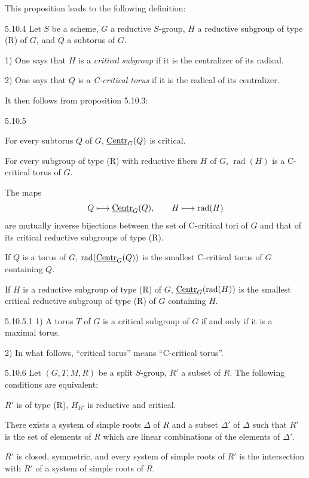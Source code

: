 This proposition leads to the following definition:
\begin{definition}{5.10.4}\label{XXII.5.10.4}
Let $S$ be a scheme, $G$ a reductive $S$-group, $H$ a reductive subgroup of type (R) of $G$, and $Q$ a subtorus of $G$.{\renewcommand{\thefootnote}{(58)}}

1) One says that $H$ is a \emph{critical subgroup} if it is the centralizer of its radical.

2) One says that $Q$ is a \emph{C-critical torus} if it is the radical of its centralizer.
\end{definition}
It then follows from proposition 5.10.3:
\begin{corollary}{5.10.5}\label{XXII.5.10.5}
\begin{enumeratei}
\item For every subtorus $Q$ of $G$, $\underline{\mathrm{Centr}}_G(Q)$ is critical.
\item For every subgroup of type (R) with reductive fibers $H$ of $G$, $\operatorname{rad}(H)$ is a C-critical torus of $G$.
\item The maps
\[
Q\longmapsto\underline{\mathrm{Centr}}_G(Q),\qquad H\longmapsto\operatorname{rad}(H)
\]
are mutually inverse bijections between the set of C-critical tori of $G$ and that of its critical reductive subgroups of type (R).
\item If $Q$ is a torus of $G$, $\operatorname{rad}(\underline{\mathrm{Centr}}_G(Q))$ is the smallest C-critical torus of $G$ containing $Q$.
\item If $H$ is a reductive subgroup of type (R) of $G$, $\underline{\mathrm{Centr}}_G(\operatorname{rad}(H))$ is the smallest critical reductive subgroup of type (R) of $G$ containing $H$.
\end{enumeratei}
\end{corollary}
\begin{remark}{5.10.5.1}\label{XXII.5.10.5.1}
{\renewcommand{\thefootnote}{(58)}\footnotemark[59]}%
1) A torus $T$ of $G$ is a critical subgroup of $G$ if and only if it is a maximal torus.

2) In what follows, ``critical torus'' means ``C-critical torus''.
\end{remark}
\begin{proposition}{5.10.6}\label{XXII.5.10.6}
Let $(G,T,M,R)$ be a split $S$-group, $R'$ a subset of $R$. The following conditions are equivalent:
\begin{enumeratei}
\item $R'$ is of type (R), $H_{R'}$ is reductive and critical.
\item There exists a system of simple roots $\Delta$ of $R$ and a subset $\Delta'$ of $\Delta$ such that $R'$ is the set of elements of $R$ which are linear combinations of the elements of $\Delta'$.
\item $R'$ is closed, symmetric, and every system of simple roots of $R'$ is the intersection with $R'$ of a system of simple roots of $R$.
\end{enumeratei}
\end{proposition}
